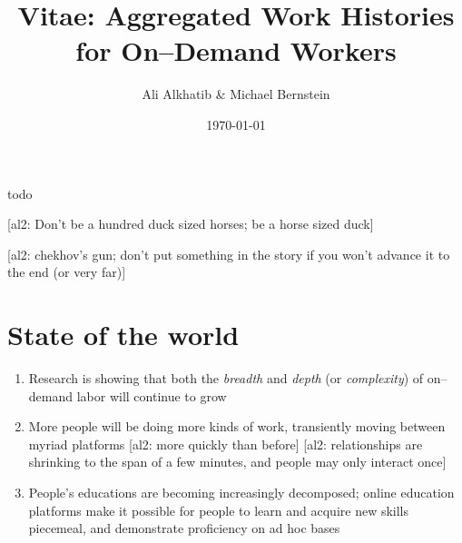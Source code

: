 \documentclass[10pt]{article}
\title{Vitae: Aggregated Work Histories for On--Demand Workers}
\author{Ali Alkhatib \& Michael Bernstein}
\date{\today}
\makeatletter
\renewcommand{\maketitle}{\bgroup\setlength{\parindent}{0pt}
\begin{flushleft}
  {\scshape \Large \textbf{\@title}}

  \vspace{1ex}

  \@author
\end{flushleft}\egroup
}
\newcommand{\ali}[1]{{\color{Red}[al2: #1]}}
\renewenvironment{abstract}{%
\hfill\begin{minipage}{0.95\textwidth}
\itshape
}
{
\bigskip
\end{minipage}}
\makeatother
\begin{document}
  \maketitle

\begin{abstract}
todo
\end{abstract}


\ali{Don't be a hundred duck sized horses; be a horse sized duck}

\ali{chekhov's gun; don't put something in the story if you won't advance it to the end (or very far)}



\section*{State of the world}
\begin{enumerate}[noitemsep]
  \item Research is showing that both the \textit{breadth} and \textit{depth} (or \textit{complexity})
        of on--demand labor will continue to grow
  \item More people will be doing more kinds of work, transiently moving between myriad platforms \ali{more quickly than before}
  \ali{relationships are shrinking to the span of a few minutes, and people may only interact once}
  \item People's educations are becoming increasingly decomposed;
  online education platforms make it possible for people to learn and acquire new skills piecemeal,
  and demonstrate proficiency on ad hoc bases
\end{enumerate}
\end{document}
